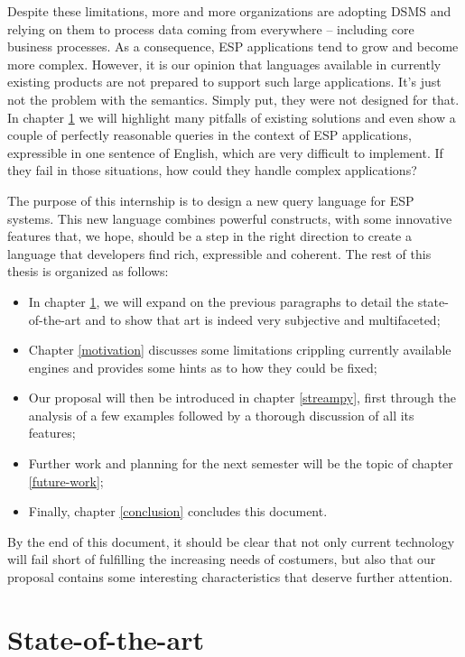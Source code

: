 \documentclass{report}
\begin{document}
Despite these limitations, more and more organizations are adopting
DSMS and relying on them to process data coming from everywhere --
including core business processes. As a consequence, ESP applications
tend to grow and become more complex. However, it is our opinion that
languages available in currently existing products are not prepared to
support such large applications. It's just not the problem with the
semantics. Simply put, they were not designed for that. In chapter
\ref{state-of-the-art} we will highlight many pitfalls of existing
solutions and even show a couple of perfectly reasonable queries in
the context of ESP applications, expressible in one sentence of
English, which are very difficult to implement. If they fail in those
situations, how could they handle complex applications?

The purpose of this internship is to design a new query language for
ESP systems. This new language combines powerful constructs, with some
innovative features that, we hope, should be a step in the right
direction to create a language that developers find rich, expressible
and coherent. The rest of this thesis is organized as follows:

\begin{itemize}
\item In chapter \ref{state-of-the-art}, we will expand on the
  previous paragraphs to detail the state-of-the-art and to show that
  art is indeed very subjective and multifaceted;
\item Chapter \ref{motivation} discusses some limitations crippling
  currently available engines and provides some hints as to how they
  could be fixed;
\item Our proposal will then be introduced in chapter \ref{streampy},
  first through the analysis of a few examples followed by a thorough
  discussion of all its features;
\item Further work and planning for the next semester will be the
  topic of chapter \ref{future-work};
\item Finally, chapter \ref{conclusion} concludes this document.
\end{itemize}

By the end of this document, it should be clear that not only current
technology will fail short of fulfilling the increasing needs of
costumers, but also that our proposal contains some interesting
characteristics that deserve further attention.

\chapter{State-of-the-art}
\label{state-of-the-art}
\end{document}

